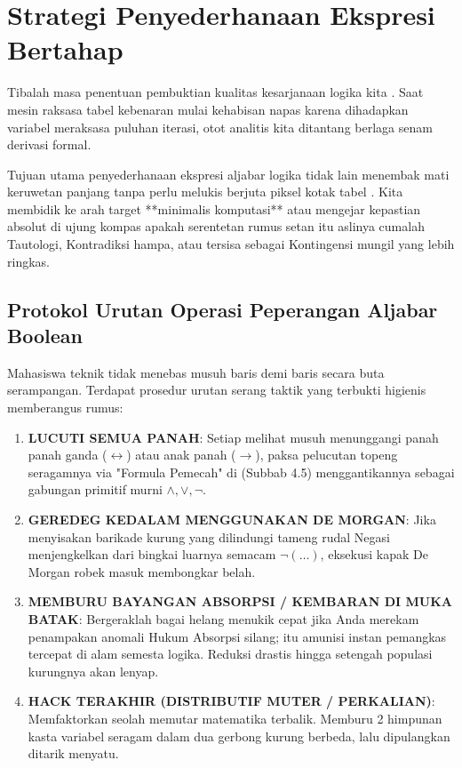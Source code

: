 \section{Strategi Penyederhanaan Ekspresi Bertahap}

Tibalah masa penentuan pembuktian kualitas kesarjanaan logika kita \cite{wiki_first_order_logic}. Saat mesin raksasa tabel kebenaran mulai kehabisan napas karena dihadapkan variabel meraksasa puluhan iterasi, otot analitis kita ditantang berlaga senam derivasi formal.

Tujuan utama penyederhanaan ekspresi aljabar logika tidak lain menembak mati keruwetan panjang tanpa perlu melukis berjuta piksel kotak tabel \cite{rosen2019}. Kita membidik ke arah target **minimalis komputasi** atau mengejar kepastian absolut di ujung kompas apakah serentetan rumus setan itu aslinya cumalah Tautologi, Kontradiksi hampa, atau tersisa sebagai Kontingensi mungil yang lebih ringkas.

\subsection{Protokol Urutan Operasi Peperangan Aljabar Boolean}

Mahasiswa teknik tidak menebas musuh baris demi baris secara buta serampangan. Terdapat prosedur urutan serang taktik yang terbukti higienis memberangus rumus:
\begin{enumerate}
    \item \textbf{LUCUTI SEMUA PANAH}: Setiap melihat musuh menunggangi panah panah ganda ($\leftrightarrow$) atau anak panah ($\rightarrow$), paksa pelucutan topeng seragamnya via "Formula Pemecah" di (Subbab 4.5) menggantikannya sebagai gabungan primitif murni $\wedge, \vee, \neg$.
    \item \textbf{GEREDEG KEDALAM MENGGUNAKAN DE MORGAN}: Jika menyisakan barikade kurung yang dilindungi tameng rudal Negasi menjengkelkan dari bingkai luarnya semacam $\neg(\dots)$, eksekusi kapak De Morgan robek masuk membongkar belah.
    \item \textbf{MEMBURU BAYANGAN ABSORPSI / KEMBARAN DI MUKA BATAK}: Bergeraklah bagai helang menukik cepat jika Anda merekam penampakan anomali Hukum Absorpsi silang; itu amunisi instan pemangkas tercepat di alam semesta logika. Reduksi drastis hingga setengah populasi kurungnya akan lenyap.
    \item \textbf{HACK TERAKHIR (DISTRIBUTIF MUTER / PERKALIAN)}: Memfaktorkan seolah memutar matematika terbalik. Memburu 2 himpunan kasta variabel seragam dalam dua gerbong kurung berbeda, lalu dipulangkan ditarik menyatu.
\end{enumerate}

